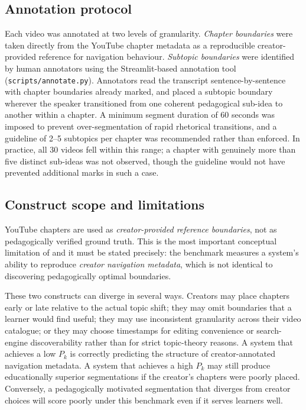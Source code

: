 \subsection{Annotation protocol}

Each video was annotated at two levels of granularity.
\emph{Chapter boundaries} were taken directly from the YouTube chapter
metadata as a reproducible creator-provided reference for navigation behaviour.
\emph{Subtopic boundaries} were identified by human annotators using the
Streamlit-based annotation tool (\texttt{scripts/annotate.py}).
Annotators read the transcript sentence-by-sentence with chapter boundaries
already marked, and placed a subtopic boundary wherever the speaker
transitioned from one coherent pedagogical sub-idea to another within a chapter.
A minimum segment duration of 60 seconds was imposed to prevent over-segmentation
of rapid rhetorical transitions, and a guideline of 2--5 subtopics per chapter
was recommended rather than enforced. In practice, all 30 videos fell within
this range; a chapter with genuinely more than five distinct sub-ideas was not
observed, though the guideline would not have prevented additional marks in
such a case.

\subsection{Construct scope and limitations}
\label{sec:youtube_validity}

YouTube chapters are used as \emph{creator-provided reference boundaries}, not
as pedagogically verified ground truth.
This is the most important conceptual limitation of \lecseg{} and it must be
stated precisely: the benchmark measures a system's ability to reproduce
\emph{creator navigation metadata}, which is not identical to discovering
pedagogically optimal boundaries.

These two constructs can diverge in several ways.
Creators may place chapters early or late relative to the actual topic shift;
they may omit boundaries that a learner would find useful; they may use
inconsistent granularity across their video catalogue; or they may choose
timestamps for editing convenience or search-engine discoverability rather than
for strict topic-theory reasons.
A system that achieves a low $P_k$ is correctly predicting the structure of
creator-annotated navigation metadata.
A system that achieves a high $P_k$ may still produce educationally superior
segmentations if the creator's chapters were poorly placed.
Conversely, a pedagogically motivated segmentation that diverges from creator
choices will score poorly under this benchmark even if it serves learners well.

